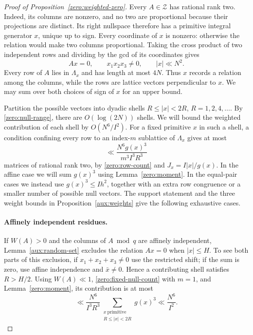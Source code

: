 \begin{proof}[Proof of Proposition~\ref{zero:weighted-zero}]
Every $A\in\mathcal Z$ has rational rank two.  Indeed, its columns
are nonzero, and no two are proportional because their projections
are distinct.  Its right nullspace therefore has a primitive
integral generator $x$, unique up to sign.  Every coordinate of
$x$ is nonzero: otherwise the relation would make two columns
proportional.  Taking the cross product of two independent rows
and dividing by the gcd of its coordinates gives
\begin{equation}\label{zero:null-range}
 Ax=0,\qquad x_1x_2x_3\ne0,\qquad |x|\ll N^2.
\end{equation}
Every row of $A$ lies in $\Lambda_x$ and has length at most $4N$.
Thus $x$ records a relation among the columns, while the rows are lattice
vectors perpendicular to $x$.  We may sum over both choices of sign of
$x$ for an upper bound.

Partition the possible vectors into dyadic shells
$R\le |x|<2R$, $R=1,2,4,\ldots$.  By
\eqref{zero:null-range}, there are $O(\log(2N))$ shells.  We will
bound the weighted contribution of each shell by $O(N^6/I^2)$.
For a fixed primitive $x$ in such a shell, a condition confining every
row to an index-$m$ sublattice of $\Lambda_x$ gives at most
\begin{equation}\label{zero:fixed-null-count}
 \ll \frac{N^6g(x)^3}{m^3I^3R^3}
\end{equation}
matrices of rational rank two, by \eqref{zero:row-count} and
$J_x=I|x|/g(x)$.  In the affine case we will sum $g(x)^3$ using
Lemma~\ref{zero:moment}.  In the equal-pair cases we instead use
$g(x)^3\le Ih^2$, together with an extra row congruence or a smaller
number of possible null vectors.
The support statement and the three weight bounds in
Proposition~\ref{aux:weights} give the following exhaustive cases.

\paragraph{Affinely independent residues.}
If $W(A)>0$ and the columns of $A\bmod q$ are affinely
independent, Lemma~\ref{aux:random-set} excludes the
relation $Ax=0$ when $|x|\le H$.  To see both parts of this
exclusion, if $x_1+x_2+x_3\ne0$ use the restricted shift; if the
sum is zero, use affine independence and $\bar x\ne0$.
Hence a contributing shell satisfies $R>H/2$.
Using $W(A)\ll1$, \eqref{zero:fixed-null-count} with $m=1$, and
Lemma~\ref{zero:moment}, its contribution is at most
\begin{equation}\label{zero:affine-count}
 \ll \frac{N^6}{I^3R^3}
       \sum_{\substack{x\ \mathrm{primitive}\\R\le |x|<2R}}g(x)^3
 \ll \frac{N^6}{I^2}.
\end{equation}


\end{proof}
